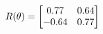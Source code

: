 \documentclass[preview]{standalone}
\begin{document}
\begin{align*}
\special{dvisvgm:raw <g id='unique000'>}R(\theta) = \begin{bmatrix}0.77 & 0.64\\-0.64 & 0.77\end{bmatrix}\special{dvisvgm:raw </g>}
\end{align*}
\end{document}
